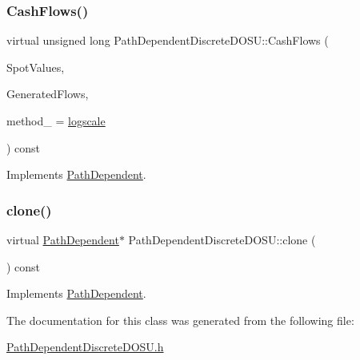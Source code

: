 \subsubsection{\texorpdfstring{Cash\+Flows()}{CashFlows()}}
{\footnotesize\ttfamily virtual unsigned long Path\+Dependent\+Discrete\+D\+O\+S\+U\+::\+Cash\+Flows (\begin{DoxyParamCaption}\item[{const \hyperlink{classMJArray}{M\+J\+Array} \&}]{Spot\+Values,  }\item[{std\+::vector$<$ \hyperlink{classMyCashFlow_1_1CashFlow}{My\+Cash\+Flow\+::\+Cash\+Flow} $>$ \&}]{Generated\+Flows,  }\item[{\hyperlink{PathDependent_8h_abed946c62f140eb7ff2ac742e6ad9497}{method}}]{method\+\_\+ = {\ttfamily \hyperlink{PathDependent_8h_abed946c62f140eb7ff2ac742e6ad9497a064d3d3358889658ce07fe9f3191d1fd}{logscale}} }\end{DoxyParamCaption}) const\hspace{0.3cm}{\ttfamily [virtual]}}



Implements \hyperlink{classPathDependent_a5d5b1d6ecf9dc6be128fff9694f589c8}{Path\+Dependent}.

\hypertarget{classPathDependentDiscreteDOSU_a69414d043a94c8fb7f95730c20a086f7}{}\label{classPathDependentDiscreteDOSU_a69414d043a94c8fb7f95730c20a086f7} 
\subsubsection{\texorpdfstring{clone()}{clone()}}
{\footnotesize\ttfamily virtual \hyperlink{classPathDependent}{Path\+Dependent}$\ast$ Path\+Dependent\+Discrete\+D\+O\+S\+U\+::clone (\begin{DoxyParamCaption}{ }\end{DoxyParamCaption}) const\hspace{0.3cm}{\ttfamily [virtual]}}



Implements \hyperlink{classPathDependent_afcc10647f591175642c6dc0adba23f0b}{Path\+Dependent}.



The documentation for this class was generated from the following file\+:\begin{DoxyCompactItemize}
\item 
\hyperlink{PathDependentDiscreteDOSU_8h}{Path\+Dependent\+Discrete\+D\+O\+S\+U.\+h}\end{DoxyCompactItemize}
